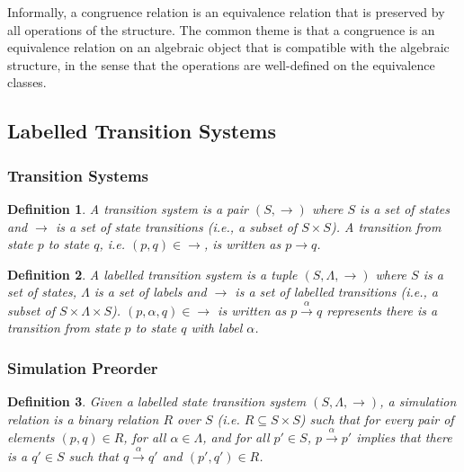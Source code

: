 \documentclass[10pt,a4paper]{article}
\newcommand{\tran}[3]{#1 \overset{#2}{\longrightarrow} #3}
\newtheorem{definition}{Definition}
\begin{document}
Informally, a congruence relation is an equivalence relation that is preserved by all operations of the structure. The common theme is that a congruence is an equivalence relation on an algebraic object that is compatible with the algebraic structure, in the sense that the operations are well-defined on the equivalence classes.

\subsection{Labelled Transition Systems}

\subsubsection{Transition Systems}

\begin{definition}
A \textnormal{transition system} is a pair $(S, \rightarrow)$ where $S$ is a set of states and $\rightarrow$ is a set of state transitions (i.e., a subset of $S \times S$). A transition from state $p$ to state $q$, i.e. $(p, q) \in \rightarrow$, is written as $p \rightarrow q$.
\end{definition}

\begin{definition}
A \textnormal{labelled transition system} is a tuple $(S, \Lambda, \rightarrow)$ where $S$ is a set of states, $\Lambda$ is a set of labels and $\rightarrow$ is a set of labelled transitions (i.e., a subset of $S \times \Lambda \times S$). $(p,\alpha,q) \in \rightarrow$ is written as $\tran{p}{\alpha}{q}$ represents there is a transition from state $p$ to state $q$ with label $\alpha$.
\end{definition}

\subsubsection{Simulation Preorder}

\begin{definition}
Given a labelled state transition system $(S, \Lambda, \rightarrow)$, a \textnormal{simulation relation} is a binary relation $R$ over $S$ (i.e. $R \subseteq S \times S$) such that for every pair of elements $(p, q) \in R$, for all $\alpha \in \Lambda$, and for all $p' \in S$, $\tran{p}{\alpha}{p'}$ implies that there is a $q' \in S$ such that $\tran{q}{\alpha}{q'}$ and $(p',q') \in R$.
\end{definition}
\end{document}
